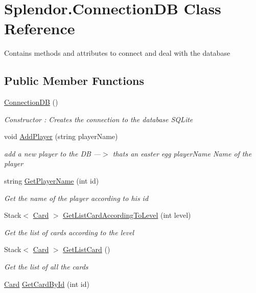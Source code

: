 \hypertarget{class_splendor_1_1_connection_d_b}{}\section{Splendor.\+Connection\+DB Class Reference}
\label{class_splendor_1_1_connection_d_b}


Contains methods and attributes to connect and deal with the database  


\subsection*{Public Member Functions}
\begin{DoxyCompactItemize}
\item 
\hyperlink{class_splendor_1_1_connection_d_b_aaaa5c66d4f12702d36a76dd21beb62c4}{Connection\+DB} ()
\begin{DoxyCompactList}\small\item\em Constructor \+: Creates the connection to the database S\+Q\+Lite \end{DoxyCompactList}\item 
void \hyperlink{class_splendor_1_1_connection_d_b_a122fc944f46910732f429432c0f80ec3}{Add\+Player} (string player\+Name)
\begin{DoxyCompactList}\small\item\em add a new player to the DB ---$>$ that\textquotesingle{}s an easter egg {\itshape player\+Name} Name of the player \end{DoxyCompactList}\item 
string \hyperlink{class_splendor_1_1_connection_d_b_a7d715d5452049ad06f4a407fa5df151c}{Get\+Player\+Name} (int id)
\begin{DoxyCompactList}\small\item\em Get the name of the player according to his id \end{DoxyCompactList}\item 
Stack$<$ \hyperlink{class_splendor_1_1_card}{Card} $>$ \hyperlink{class_splendor_1_1_connection_d_b_abcd995d0fa97aa5f3a40ff5c23b22502}{Get\+List\+Card\+According\+To\+Level} (int level)
\begin{DoxyCompactList}\small\item\em Get the list of cards according to the level \end{DoxyCompactList}\item 
Stack$<$ \hyperlink{class_splendor_1_1_card}{Card} $>$ \hyperlink{class_splendor_1_1_connection_d_b_a16d2e7cd88bb81d7535dc19f49e82943}{Get\+List\+Card} ()
\begin{DoxyCompactList}\small\item\em Get the list of all the cards \end{DoxyCompactList}\item 
\hyperlink{class_splendor_1_1_card}{Card} \hyperlink{class_splendor_1_1_connection_d_b_a1d7511e41b837b176737fd1b8d19f921}{Get\+Card\+By\+Id} (int id)
\end{DoxyCompactItemize}


